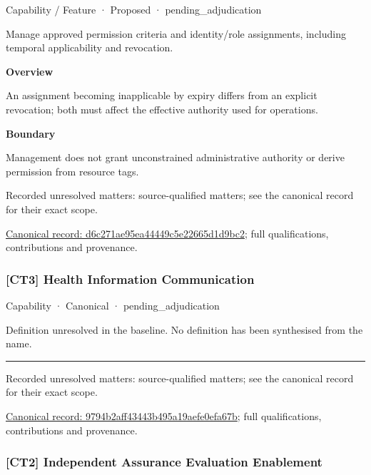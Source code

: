 \label{element:d6c271ae95ea44449c5e22665d1d9bc2}
{\small Capability / Feature · Proposed · pending\_adjudication}\par

Manage approved permission criteria and identity/role assignments, including temporal applicability and revocation.



\textbf{Overview}



An assignment becoming inapplicable by expiry differs from an explicit revocation; both must affect the effective authority used for operations.



\textbf{Boundary}



Management does not grant unconstrained administrative authority or derive permission from resource tags.


{\small Recorded unresolved matters: source-qualified matters; see the canonical record for their exact scope.}\par
{\footnotesize \href{../../../../continuum/strategy/capability/feature/d6c271ae95ea44449c5e22665d1d9bc2.md}{Canonical record: d6c271ae95ea44449c5e22665d1d9bc2}; full qualifications, contributions and provenance.}\par
\subsubsection{[CT3] Health Information Communication}

\label{element:9794b2aff43443b495a19aefe0efa67b}
{\small Capability · Canonical · pending\_adjudication}\par

Definition unresolved in the baseline. No definition has been synthesised from the name.



\medskip\hrule\medskip

{\small Recorded unresolved matters: source-qualified matters; see the canonical record for their exact scope.}\par
{\footnotesize \href{../../../../continuum/strategy/capability/9794b2aff43443b495a19aefe0efa67b.md}{Canonical record: 9794b2aff43443b495a19aefe0efa67b}; full qualifications, contributions and provenance.}\par
\subsubsection{[CT2] Independent Assurance Evaluation Enablement}

